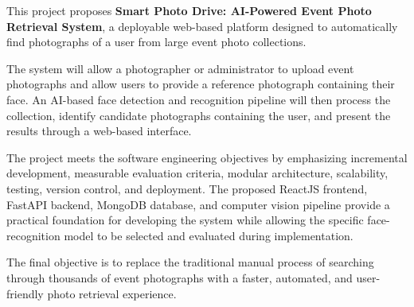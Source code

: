 \documentclass[11pt,a4paper]{article}
\begin{document}
This project proposes \textbf{Smart Photo Drive: AI-Powered Event Photo
Retrieval System}, a deployable web-based platform designed to
automatically find photographs of a user from large event photo
collections.

The system will allow a photographer or administrator to upload event
photographs and allow users to provide a reference photograph
containing their face. An AI-based face detection and recognition
pipeline will then process the collection, identify candidate
photographs containing the user, and present the results through a
web-based interface.

The project meets the software engineering objectives by emphasizing
incremental development, measurable evaluation criteria, modular
architecture, scalability, testing, version control, and deployment.
The proposed ReactJS frontend, FastAPI backend, MongoDB database, and
computer vision pipeline provide a practical foundation for developing
the system while allowing the specific face-recognition model to be
selected and evaluated during implementation.

The final objective is to replace the traditional manual process of
searching through thousands of event photographs with a faster,
automated, and user-friendly photo retrieval experience.
\end{document}

